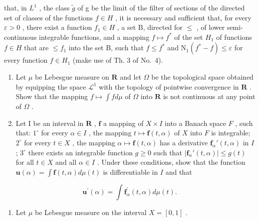 that, in \(L^{1}\) , the class \(\widetilde{g}\) of g be the limit of the filter of sections of the directed set of classes of the functions \(f \in H\) , it is necessary and sufficient that, for every \(\varepsilon > 0\) , there exist a function \(f_{1} \in H\) , a set B, directed for \(\leqslant\) , of lower semi-continuous integrable functions, and a mapping \(f \mapsto f^{*}\) of the set \(H_{1}\) of functions \(f \in H\) that are \(\leqslant f_{1}\) into the set B, such that \(f \leqslant f^{*}\) and \(\mathrm{N}_{1}(f^{*} - f) \leqslant \varepsilon\) for every function \(f \in H_{1}\) (make use of Th. 3 of No.~4).

\begin{enumerate}
\def\labelenumi{\arabic{enumi})}
\setcounter{enumi}{1}
\item
  Let \(\mu\) be Lebesgue measure on \(\mathbf{R}\) and let \(\Omega\) be the topological space obtained by equipping the space \(\mathcal{L}^1\) with the topology of pointwise convergence in \(\mathbf{R}\) . Show that the mapping \(f\mapsto \int fd\mu\) of \(\Omega\) into \(\mathbf{R}\) is not continuous at any point of \(\Omega\) .
\item
  Let I be an interval in \(\mathbf{R}\) , \(\mathbf{f}\) a mapping of \(X \times I\) into a Banach space \(F\) , such that: \(1^{\circ}\) for every \(\alpha \in I\) , the mapping \(t \mapsto \mathbf{f}(t, \alpha)\) of \(X\) into \(F\) is integrable; \(2^{\circ}\) for every \(t \in X\) , the mapping \(\alpha \mapsto \mathbf{f}(t, \alpha)\) has a derivative \(\mathbf{f}_{\alpha}'(t, \alpha)\) in \(I\) ; \(3^{\circ}\) there exists an integrable function \(g \geqslant 0\) such that \(|\mathbf{f}_{\alpha}'(t, \alpha)| \leqslant g(t)\) for all \(t \in X\) and all \(\alpha \in I\) . Under these conditions, show that the function \(\mathbf{u}(\alpha) = \int \mathbf{f}(t, \alpha) d\mu(t)\) is differentiable in \(I\) and that
\end{enumerate}

\[
\mathbf {u} ^ {\prime} (\alpha) = \int \mathbf {f} _ {\alpha} ^ {\prime} (t, \alpha) d \mu (t).
\]

\begin{enumerate}
\def\labelenumi{\arabic{enumi})}
\setcounter{enumi}{3}
\tightlist
\item
  Let \(\mu\) be Lebesgue measure on the interval \(X = [0,1]\) .
\end{enumerate}

